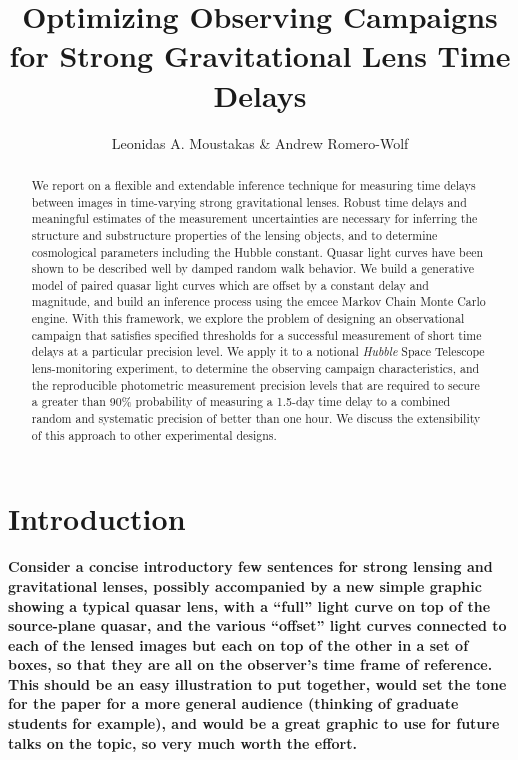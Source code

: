 \documentclass{emulateapj}
\begin{document}
\title{Optimizing Observing Campaigns for Strong  Gravitational Lens Time Delays} 
\author{Leonidas A. Moustakas \& Andrew Romero-Wolf} 

\begin{abstract}
  We report on a flexible and extendable inference technique for
  measuring time delays between images in time-varying strong
  gravitational lenses.  Robust time delays and meaningful estimates
  of the measurement uncertainties are necessary for inferring the structure and substructure properties of
  the lensing objects, and to determine cosmological parameters
  including the Hubble constant.  Quasar light curves have been shown
  to be described well by damped random walk behavior. We build a
  generative model of paired quasar light curves which are offset by a constant
  delay and magnitude, and build an inference process
  using the emcee Markov Chain Monte Carlo engine.  With this
  framework, we explore the problem of designing an observational
  campaign that satisfies specified thresholds for a successful
  measurement of short time delays at a particular precision level. 
  We apply it to a notional \emph{Hubble} Space Telescope
  lens-monitoring experiment, to determine the observing campaign
  characteristics, and the reproducible photometric measurement
  precision levels that are required to secure a greater than 90\%
  probability of measuring a 1.5-day time delay to a combined random
  and systematic precision of better than one hour.  We discuss the
  extensibility of this approach to other experimental designs.
\end{abstract}
 

\section{Introduction}

{\bf Consider a concise introductory few sentences for strong lensing
  and gravitational lenses, possibly accompanied by a new simple
  graphic showing a typical quasar lens, with a ``full'' light curve
  on top of the source-plane quasar, and the various ``offset'' light
  curves connected to each of the lensed images but each on top of the
  other in a set of boxes, so that they are all on the observer's time
  frame of reference. This should be an easy illustration to put
  together, would set the tone for the paper for a more general
  audience (thinking of graduate students for example), and would be a
great graphic to use for future talks on the topic, so very much worth
the effort.} 
\end{document}
